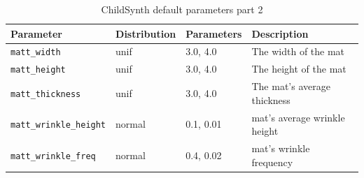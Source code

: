 \documentclass{article}
\begin{document}
\begin{table}[h]
    \centering
    \scriptsize
    \begin{tabular}{|l|l|l|l|}
    \hline
    \textbf{Parameter} & \textbf{Distribution} & \textbf{Parameters} & \textbf{Description} \\ 
    \hline
    \texttt{matt\_width} & unif & 3.0, 4.0 & The width of the mat\\
    \texttt{matt\_height} & unif & 3.0, 4.0 & The height of the mat\\
    \texttt{matt\_thickness} & unif & 3.0, 4.0 & The mat's average thickness\\
    \texttt{matt\_wrinkle\_height} & normal & 0.1, 0.01 & mat's average wrinkle height\\
    \texttt{matt\_wrinkle\_freq} & normal & 0.4, 0.02 & mat's wrinkle frequency\\
    \hline
    \end{tabular}
    \caption{ChildSynth default parameters part 2}
    \label{table:defaults_2}
\end{table}




\end{document}
